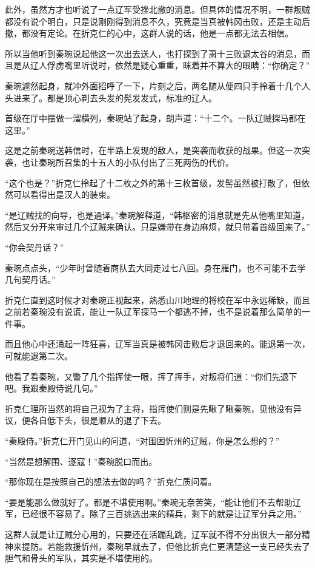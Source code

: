 此外，虽然方才也听说了一点辽军受挫北撤的消息。但具体的情况不明，一群叛贼都没有说个明白，只是说刚刚得到消息不久，究竟是当真被韩冈击败，还是主动后撤，都没有定论。在折克仁的心中，这群人说的话，他是一点都无法去相信。

所以当他听到秦琬说起他这一次出去送人，也打探到了萧十三败退太谷的消息，而且是从辽人俘虏嘴里听说时，依然是疑心重重，眯着并不算大的眼睛：“你确定？”

秦琬遽然起身，就冲外面招呼了一下，片刻之后，两名随从便四只手拎着十几个人头进来了。都是顶心剃去头发的髡发发式，标准的辽人。

首级在厅中摆做一溜横列，秦琬站了起身，朗声道：“十二个。一队辽贼探马都在这里。”

这是之前秦琬送韩信时，在半路上发现的敌人，是突袭而收获的战果。但这一次突袭，也让秦琬所召集的十五人的小队付出了三死两伤的代价。

“这个也是？”折克仁拎起了十二枚之外的第十三枚首级，发髻虽然被打散了，但依然可以看得出是汉人的装束。

“是辽贼找的向导，也是通译。”秦琬解释道，“韩枢密的消息就是先从他嘴里知道，然后又分开来审过几个辽贼来确认。只是嫌带在身边麻烦，就只带着首级回来了。”

“你会契丹话？”

秦琬点点头，“少年时曾随着商队去大同走过七八回。身在雁门，也不可能不去学几句契丹话。”

折克仁直到这时候才对秦琬正视起来，熟悉山川地理的将校在军中永远稀缺，而且之前若秦琬没有说谎，能让一队辽军探马一个都逃不掉，也不是说着那么简单的一件事。

而且他心中还涌起一阵狂喜，辽军当真是被韩冈击败后才退回来的。能退第一次，可就能退第二次。

他看了看秦琬，又瞥了几个指挥使一眼，挥了挥手，对叛将们道：“你们先退下吧。我跟秦殿侍说几句。”

折克仁理所当然的将自己视为了主将，指挥使们则是先瞅了瞅秦琬，见他没有异议，便各自低下头，很是顺从的退了下去。

“秦殿侍。”折克仁开门见山的问道，“对围困忻州的辽贼，你是怎么想的？”

“当然是想解围、逐寇！”秦琬脱口而出。

“那你现在是按照自己的想法去做的吗？”折克仁质问着。

“要是能那么做就好了。都是不堪使用啊。”秦琬无奈苦笑，“能让他们不去帮助辽军，已经很不容易了。除了三百挑选出来的精兵，剩下的就是让辽军分兵之用。”

这群人就是让辽贼分心用的，只要还在活蹦乱跳，辽军就不得不分出很大一部分精神来提防。若能救援忻州，秦琬早就去了，但他比折克仁更清楚这一支已经失去了胆气和骨头的军队，其实是不堪使用的。

